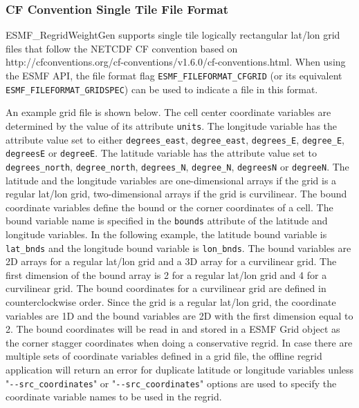\subsubsection{CF Convention Single Tile File Format}\label{sec:fileformat:gridspec}

ESMF\_RegridWeightGen supports single tile logically rectangular lat/lon grid files that follow the NETCDF CF convention based on
 {http://cfconventions.org/cf-conventions/v1.6.0/cf-conventions.html}. When using the ESMF API, the file format flag {\tt ESMF\_FILEFORMAT\_CFGRID} (or its equivalent {\tt ESMF\_FILEFORMAT\_GRIDSPEC}) can be used to indicate a file in this format.  

 An example grid file is shown below.
The cell center coordinate variables are determined by the value of its attribute {\tt units}.  The longitude
variable has the attribute value set to either {\tt degrees\_east}, {\tt degree\_east}, {\tt degrees\_E}, {\tt degree\_E},
{\tt degreesE} or {\tt degreeE}.  The latitude variable has the attribute value set to {\tt degrees\_north}, {\tt degree\_north}, {\tt degrees\_N},
{\tt degree\_N}, {\tt degreesN} or {\tt degreeN}.   The latitude and the longitude variables are one-dimensional arrays if the grid is a regular lat/lon grid, two-dimensional arrays if the grid is curvilinear. The bound coordinate
variables define the bound or the corner coordinates of a cell.  The bound variable name is specified in the
{\tt bounds} attribute of the latitude and longitude variables.  In the following example, the latitude bound
variable is {\tt lat\_bnds} and the longitude bound variable is {\tt lon\_bnds}.  The bound variables are 2D
arrays for a regular lat/lon grid and a 3D array for a curvilinear grid.  The first dimension of the bound
array is 2 for a regular lat/lon grid and 4 for a curvilinear grid.  The bound coordinates for a curvilinear
grid are defined in counterclockwise order. Since the grid is a regular lat/lon grid,
the coordinate variables are 1D and the bound variables are 2D with the first dimension equal to 2.
The bound coordinates will be read in and stored in a ESMF Grid object as the corner stagger coordinates when doing a conservative regrid.  In case there are multiple sets of coordinate variables defined in a grid file,
the offline regrid application will return an error for duplicate latitude or longitude variables unless
"{\tt \verb+--+src\_coordinates}" or "{\tt \verb+--+src\_coordinates}" options are used to specify the coordinate variable names
to be used in the regrid.

